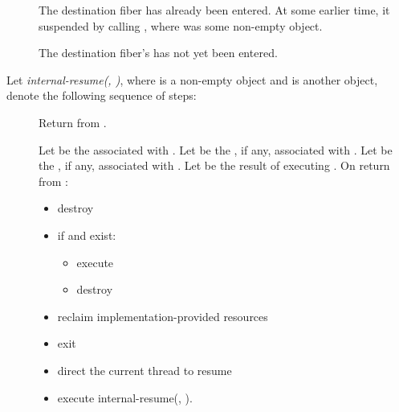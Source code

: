 \begin{description}
    \item[] The destination fiber has already been entered. At some earlier
          time, it suspended by calling \resumewith[other], where 
          was some non-empty \fiber object.
    \item[] The destination fiber's \entryfn has not yet been entered.
\end{description}

Let \emph{internal-resume(, )}, where  is a
non-empty \fiber object and  is another \fiber object, denote the
following sequence of steps:

\begin{description}
    \item[] Return  from \resumewith[other].
    \item[]
           Let  be the  associated with .
           Let  be the , if any, associated with .
           Let  be the , if any, associated with .
           Let  be the result of executing
           .
           On return from :
        \begin{itemize}
            \item destroy 
            \item if  and  exist:
                \begin{itemize}
                    \item execute 
                    \item destroy 
                \end{itemize}
            \item reclaim implementation-provided resources
            \item exit 
            \item direct the current thread to resume 
            \item execute internal-resume(, ).
        \end{itemize}
\end{description}

